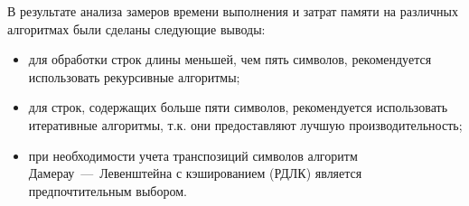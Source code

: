 В результате анализа замеров времени выполнения и затрат памяти на различных алгоритмах были сделаны следующие выводы:

\begin{itemize}
	\item для обработки строк длины меньшей, чем пять символов, рекомендуется использовать рекурсивные алгоритмы;
	\item для строк, содержащих больше пяти символов, рекомендуется использовать итеративные алгоритмы, т.к. они предоставляют лучшую производительность;
	\item при необходимости учета транспозиций символов алгоритм Дамерау~---~Левенштейна с кэшированием (РДЛК) является предпочтительным выбором.
\end{itemize}